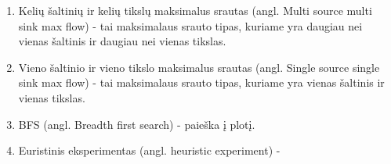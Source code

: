 \begin{enumerate}
	\item Kelių šaltinių ir kelių tikslų maksimalus srautas (angl. Multi source multi sink max flow) - tai maksimalaus srauto tipas, kuriame yra daugiau nei vienas šaltinis ir daugiau nei vienas tikslas.
	\item Vieno šaltinio ir vieno tikslo maksimalus srautas (angl. Single source single sink max flow) - tai maksimalaus srauto tipas, kuriame yra vienas šaltinis ir vienas tikslas.
	\item BFS (angl. Breadth first search) - paieška į plotį.
	\item Euristinis eksperimentas (angl. heuristic experiment) -
\end{enumerate}